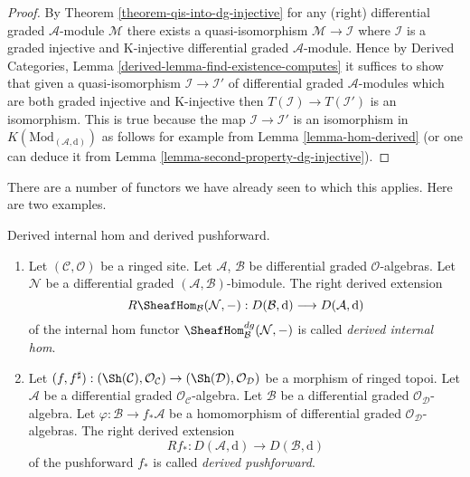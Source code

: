 \begin{proof}
By Theorem \ref{theorem-qis-into-dg-injective}
for any (right) differential graded $\mathcal{A}$-module
$\mathcal{M}$ there exists a quasi-isomorphism
$\mathcal{M} \to \mathcal{I}$ where $\mathcal{I}$
is a graded injective and K-injective
differential graded $\mathcal{A}$-module.
Hence by Derived Categories, Lemma \ref{derived-lemma-find-existence-computes}
it suffices to show that given a quasi-isomorphism
$\mathcal{I} \to \mathcal{I}'$ of differential graded
$\mathcal{A}$-modules which are both
graded injective and K-injective
then $T(\mathcal{I}) \to T(\mathcal{I}')$ is an isomorphism.
This is true because the map $\mathcal{I} \to \mathcal{I}'$
is an isomorphism in $K(\text{Mod}_{(\mathcal{A}, \text{d})})$ as follows
for example from Lemma \ref{lemma-hom-derived} (or one can
deduce it from Lemma \ref{lemma-second-property-dg-injective}).
\end{proof}

\noindent
There are a number of functors we have already seen to which this applies.
Here are two examples.

\begin{definition}
\label{definition-pushforward}
Derived internal hom and derived pushforward.
\begin{enumerate}
\item Let $(\mathcal{C}, \mathcal{O})$ be a ringed site. Let
$\mathcal{A}$, $\mathcal{B}$ be differential graded $\mathcal{O}$-algebras.
Let $\mathcal{N}$ be a  differential graded
$(\mathcal{A}, \mathcal{B})$-bimodule. The right derived extension
$$
R\SheafHom_\mathcal{B}(\mathcal{N}, -) :
D(\mathcal{B}, \text{d})
\longrightarrow
D(\mathcal{A}, \text{d})
$$
of the internal hom functor $\SheafHom_\mathcal{B}^{dg}(\mathcal{N}, -)$
is called {\it derived internal hom}.
\item Let $(f, f^\sharp) : (\Sh(\mathcal{C}), \mathcal{O}_\mathcal{C})
\to (\Sh(\mathcal{D}), \mathcal{O}_\mathcal{D})$
be a morphism of ringed topoi. Let $\mathcal{A}$ be a differential
graded $\mathcal{O}_\mathcal{C}$-algebra. Let $\mathcal{B}$ be a
differential graded $\mathcal{O}_\mathcal{D}$-algebra. Let
$\varphi : \mathcal{B} \to f_*\mathcal{A}$ be a homomorphism
of differential graded $\mathcal{O}_\mathcal{D}$-algebras.
The right derived extension
$$
Rf_* :
D(\mathcal{A}, \text{d})
\longrightarrow
D(\mathcal{B}, \text{d})
$$
of the pushforward $f_*$ is called {\it derived pushforward}.
\end{enumerate}
\end{definition}

